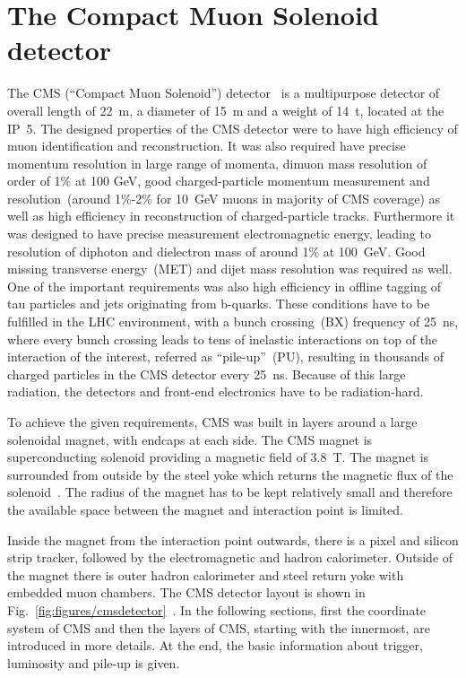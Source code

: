 \newpage

\section{The Compact Muon Solenoid detector~\label{sec:CMS}}

The CMS (``Compact Muon Solenoid'') detector~\cite{Chatrchyan:2008aa, CMSproposal} is a multipurpose detector of overall length of 22~m, a diameter of 15~m and a weight of 14~t, located at the IP~5. The designed properties of the CMS  detector were to have high efficiency of muon identification and reconstruction. It was also required have precise momentum resolution in large range of momenta, dimuon mass resolution of order of 1\% at 100 GeV, good charged-particle momentum measurement and resolution~(around 1\%-2\% for 10~GeV muons in majority of CMS coverage) as well as high efficiency in reconstruction of charged-particle tracks. Furthermore it was designed to have precise measurement electromagnetic energy, leading to resolution of diphoton and dielectron mass of around 1\% at 100~GeV. Good missing transverse energy~(MET) and dijet mass resolution was required as well. One of the important requirements was also high efficiency in offline tagging of tau particles and jets originating from b-quarks. These conditions have to be fulfilled in the LHC environment, with a bunch crossing~(BX) frequency of 25~ns, where every bunch crossing leads to tens of inelastic interactions on top of the interaction of the interest, referred as ``pile-up''~(PU), resulting in thousands of charged particles in the CMS detector every 25~ns. Because of this large radiation, the detectors and front-end electronics have to be radiation-hard.

To achieve the given requirements, CMS was built in layers around a large solenoidal magnet, with endcaps at each side. The CMS magnet is superconducting solenoid providing a magnetic field of 3.8~T. The magnet is surrounded from outside by the steel yoke which returns the magnetic flux of the solenoid~\cite{tdrMagnet}. The radius of the magnet has to be kept relatively small and therefore the available space between the magnet and interaction point is limited.

Inside the magnet from the interaction point outwards, there is a pixel and silicon strip tracker, followed by the electromagnetic and hadron calorimeter. Outside of the magnet there is outer hadron calorimeter and steel return yoke with embedded muon chambers. The CMS detector layout is shown in Fig.~\ref{fig:figures/cmsdetector}~\cite{website:CMSdet}. In the following sections, first the coordinate system of CMS and then the layers of CMS, starting with the innermost, are introduced in more details. At the end, the basic information about trigger, luminosity and pile-up is given.


